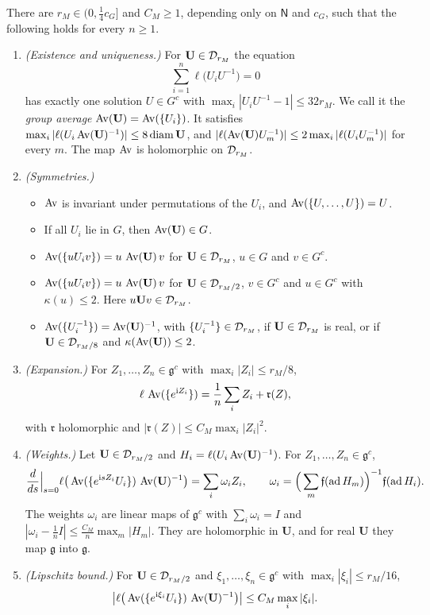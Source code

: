 \begin{lemma}\label{lem:group-average}
There are $r_M\in(0,\frac14c_G]$ and $C_M\ge1$, depending only on $\mathsf N$ and $c_G$, such that the following holds for every $n\ge1$.
\begin{enumerate}[label=(\alph*)]
\item \emph{(Existence and uniqueness.)} For $\mathbf U\in\mathcal D_{r_M}$ the equation
\begin{equation}\label{eq:group-average}
\sum_{i=1}^n\ell\big(U_iU^{-1}\big)=0
\end{equation}
has exactly one solution $U\in G^c$ with $\max_i|U_iU^{-1}-1|\le32r_M$. We call it the \emph{group average} $\operatorname{Av}(\mathbf U)=\operatorname{Av}(\{U_i\})$. It satisfies $\max_i|\ell(U_i\operatorname{Av}(\mathbf U)^{-1})|\le8\operatorname{diam}\mathbf U$, and $|\ell(\operatorname{Av}(\mathbf U)U_m^{-1})|\le2\max_i|\ell(U_iU_m^{-1})|$ for every $m$. The map $\operatorname{Av}$ is holomorphic on $\mathcal D_{r_M}$.
\item \emph{(Symmetries.)}
  \begin{itemize}
  \item $\operatorname{Av}$ is invariant under permutations of the $U_i$, and $\operatorname{Av}(\{U,\dots,U\})=U$.
  \item If all $U_i$ lie in $G$, then $\operatorname{Av}(\mathbf U)\in G$.
  \item $\operatorname{Av}(\{uU_iv\})=u\,\operatorname{Av}(\mathbf U)\,v$ for $\mathbf U\in\mathcal D_{r_M}$, $u\in G$ and $v\in G^c$.
  \item $\operatorname{Av}(\{uU_iv\})=u\,\operatorname{Av}(\mathbf U)\,v$ for $\mathbf U\in\mathcal D_{r_M/2}$, $v\in G^c$ and $u\in G^c$ with $\kappa(u)\le2$. Here $u\mathbf Uv\in\mathcal D_{r_M}$.
  \item $\operatorname{Av}(\{U_i^{-1}\})=\operatorname{Av}(\mathbf U)^{-1}$, with $\{U_i^{-1}\}\in\mathcal D_{r_M}$, if $\mathbf U\in\mathcal D_{r_M}$ is real, or if $\mathbf U\in\mathcal D_{r_M/8}$ and $\kappa(\operatorname{Av}(\mathbf U))\le2$.
  \end{itemize}
\item \emph{(Expansion.)} For $Z_1,\dots,Z_n\in\mathfrak g^c$ with $\max_i|Z_i|\le r_M/8$,
\[
\ell\,\operatorname{Av}(\{e^{\mathrm i Z_i}\})=\frac1n\sum_iZ_i+\mathfrak r(Z),
\]
with $\mathfrak r$ holomorphic and $|\mathfrak r(Z)|\le C_M\max_i|Z_i|^2$.
\item \emph{(Weights.)} Let $\mathbf U\in\mathcal D_{r_M/2}$ and $H_i=\ell(U_i\operatorname{Av}(\mathbf U)^{-1})$. For $Z_1,\dots,Z_n\in\mathfrak g^c$,
\[
\frac{d}{ds}\Big|_{s=0}\ell\big(\operatorname{Av}(\{e^{\mathrm i sZ_i}U_i\})\,\operatorname{Av}(\mathbf U)^{-1}\big)=\sum_i\omega_iZ_i,\qquad\omega_i=\Big(\sum_m\mathfrak f(\operatorname{ad}H_m)\Big)^{-1}\mathfrak f(\operatorname{ad}H_i).
\]
The weights $\omega_i$ are linear maps of $\mathfrak g^c$ with $\sum_i\omega_i=I$ and $|\omega_i-\frac1nI|\le\frac{C_M}n\max_m|H_m|$. They are holomorphic in $\mathbf U$, and for real $\mathbf U$ they map $\mathfrak g$ into $\mathfrak g$.
\item \emph{(Lipschitz bound.)} For $\mathbf U\in\mathcal D_{r_M/2}$ and $\xi_1,\dots,\xi_n\in\mathfrak g^c$ with $\max_i|\xi_i|\le r_M/16$,
\[
\big|\ell\big(\operatorname{Av}(\{e^{\mathrm i\xi_i}U_i\})\,\operatorname{Av}(\mathbf U)^{-1}\big)\big|\le C_M\max_i|\xi_i| .
\]
\end{enumerate}
\end{lemma}

